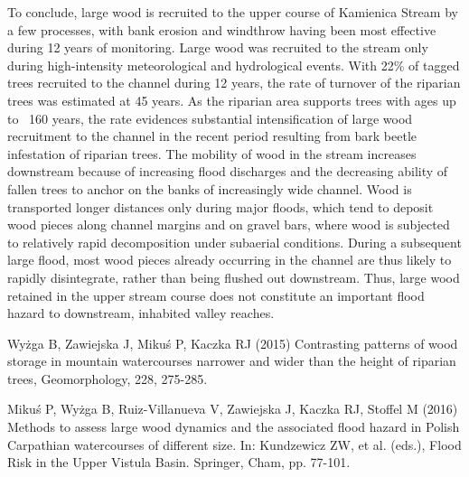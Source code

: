 {To conclude, large wood is recruited to the upper course of Kamienica Stream by a few processes, with bank erosion and windthrow having been most effective during 12 years of monitoring. Large wood was recruited to the stream only during high-intensity meteorological and hydrological events. With 22\% of tagged trees recruited to the channel during 12 years, the rate of turnover of the riparian trees was estimated at 45 years. As the riparian area supports trees with ages up to ~160 years, the rate evidences substantial intensification of large wood recruitment to the channel in the recent period resulting from bark beetle infestation of riparian trees. The mobility of wood in the stream increases downstream because of increasing flood discharges and the decreasing ability of fallen trees to anchor on the banks of increasingly wide channel. Wood is transported longer distances only during major floods, which tend to deposit wood pieces along channel margins and on gravel bars, where wood is subjected to relatively rapid decomposition under subaerial conditions. During a subsequent large flood, most wood pieces already occurring in the channel are thus likely to rapidly disintegrate, rather than being flushed out downstream. Thus, large wood retained in the upper stream course does not constitute an important flood hazard to downstream, inhabited valley reaches.
}%
{Wyżga B, Zawiejska J, Mikuś P, Kaczka RJ (2015) Contrasting patterns of wood storage in mountain watercourses narrower and wider than the height of riparian trees, Geomorphology, 228, 275-285.  

Mikuś P, Wyżga B, Ruiz-Villanueva V, Zawiejska J, Kaczka RJ, Stoffel M (2016) Methods to assess large wood dynamics and the associated flood hazard in Polish Carpathian watercourses of different size. In: Kundzewicz ZW, et al. (eds.), Flood Risk in the Upper Vistula Basin. Springer, Cham, pp. 77-101.
}%


